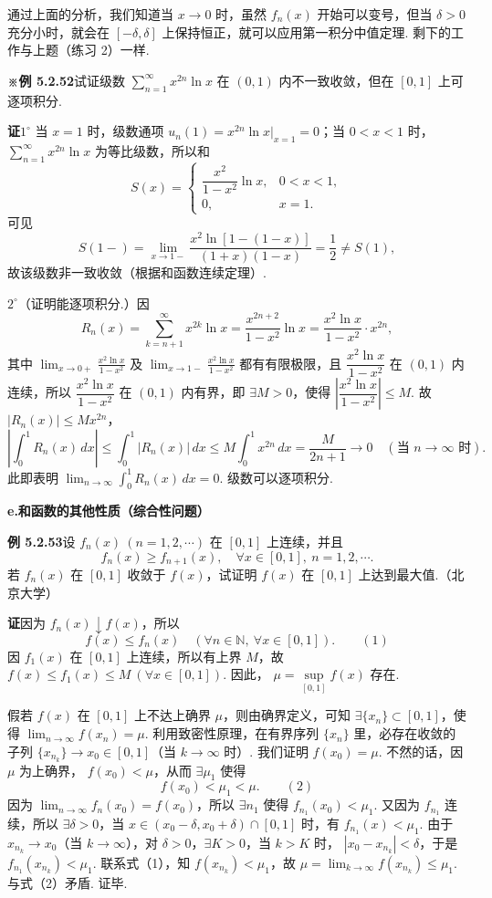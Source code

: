 \documentclass[UTF8,12pt,a4paper,fontset=fandol]{ctexart}
\begin{document}
通过上面的分析，我们知道当 $x\to0$ 时，虽然 $f_n(x)$ 开始可以变号，但当 $\delta>0$ 充分小时，就会在
$[-\delta,\delta]$ 上保持恒正，就可以应用第一积分中值定理. 剩下的工作与上题（练习 2）一样.

\noindent\textbf{※例 5.2.52}\quad 试证级数
$\displaystyle\sum_{n=1}^{\infty}x^{2n}\ln x$ 在 $(0,1)$ 内不一致收敛，但在 $[0,1]$ 上可逐项积分.

\noindent\textbf{证}\quad $1^\circ$ 当 $x=1$ 时，级数通项
$u_n(1)=x^{2n}\ln x\big|_{x=1}=0$；当 $0<x<1$ 时，
$\displaystyle\sum_{n=1}^{\infty}x^{2n}\ln x$ 为等比级数，所以和
\[
  S(x)=
  \begin{cases}
    \dfrac{x^2}{1-x^2}\ln x,&0<x<1,\\
    0,&x=1.
  \end{cases}
\]
可见
\[
  S(1-)=\lim_{x\to1-}\frac{x^2\ln[1-(1-x)]}{(1+x)(1-x)}
  =\frac12\ne S(1),
\]
故该级数非一致收敛（根据和函数连续定理）.

$2^\circ$（证明能逐项积分.）因
\[
  R_n(x)=\sum_{k=n+1}^{\infty}x^{2k}\ln x
  =\frac{x^{2n+2}}{1-x^2}\ln x
  =\frac{x^2\ln x}{1-x^2}\cdot x^{2n},
\]
其中 $\displaystyle\lim_{x\to0+}\frac{x^2\ln x}{1-x^2}$ 及
$\displaystyle\lim_{x\to1-}\frac{x^2\ln x}{1-x^2}$ 都有有限极限，且
$\dfrac{x^2\ln x}{1-x^2}$ 在 $(0,1)$ 内连续，所以
$\dfrac{x^2\ln x}{1-x^2}$ 在 $(0,1)$ 内有界，即 $\exists M>0$，使得
$\left|\dfrac{x^2\ln x}{1-x^2}\right|\le M$. 故
$|R_n(x)|\le Mx^{2n}$，
\[
  \left|\int_0^1 R_n(x)\,dx\right|
  \le\int_0^1|R_n(x)|\,dx
  \le M\int_0^1x^{2n}\,dx
  =\frac{M}{2n+1}\to0\quad(\text{当 }n\to\infty\text{ 时}).
\]
此即表明 $\displaystyle\lim_{n\to\infty}\int_0^1 R_n(x)\,dx=0$. 级数可以逐项积分.

\noindent\textbf{e.\quad 和函数的其他性质（综合性问题）}

\noindent\textbf{例 5.2.53}\quad 设 $f_n(x)\ (n=1,2,\cdots)$ 在 $[0,1]$ 上连续，并且
\[
  f_n(x)\ge f_{n+1}(x),\quad \forall x\in[0,1],\ n=1,2,\cdots.
\]
若 $f_n(x)$ 在 $[0,1]$ 收敛于 $f(x)$，试证明 $f(x)$ 在 $[0,1]$ 上达到最大值.（北京大学）

\noindent\textbf{证}\quad 因为 $f_n(x)\downarrow f(x)$，所以
\[
  f(x)\le f_n(x)\quad(\forall n\in\mathbb N,\ \forall x\in[0,1]).
\qquad(1)
\]
因 $f_1(x)$ 在 $[0,1]$ 上连续，所以有上界 $M$，故
$f(x)\le f_1(x)\le M\ (\forall x\in[0,1])$. 因此，
$\mu=\sup\limits_{[0,1]}f(x)$ 存在.

假若 $f(x)$ 在 $[0,1]$ 上不达上确界 $\mu$，则由确界定义，可知 $\exists\{x_n\}\subset[0,1]$，使得
$\displaystyle\lim_{n\to\infty}f(x_n)=\mu$. 利用致密性原理，在有界序列 $\{x_n\}$ 里，必存在收敛的子列
$\{x_{n_k}\}\to x_0\in[0,1]$（当 $k\to\infty$ 时）. 我们证明 $f(x_0)=\mu$. 不然的话，因 $\mu$ 为上确界，
$f(x_0)<\mu$，从而 $\exists\mu_1$ 使得
\[
  f(x_0)<\mu_1<\mu.
\qquad(2)
\]
因为 $\displaystyle\lim_{n\to\infty}f_n(x_0)=f(x_0)$，所以 $\exists n_1$ 使得
$f_{n_1}(x_0)<\mu_1$. 又因为 $f_{n_1}$ 连续，所以 $\exists\delta>0$，当
$x\in(x_0-\delta,x_0+\delta)\cap[0,1]$ 时，有 $f_{n_1}(x)<\mu_1$. 由于
$x_{n_k}\to x_0$（当 $k\to\infty$），对 $\delta>0$，$\exists K>0$，当 $k>K$ 时，
$|x_0-x_{n_k}|<\delta$，于是 $f_{n_1}(x_{n_k})<\mu_1$. 联系式（1），知
$f(x_{n_k})<\mu_1$，故
$\mu=\displaystyle\lim_{k\to\infty}f(x_{n_k})\le\mu_1$. 与式（2）矛盾. 证毕.
\end{document}
